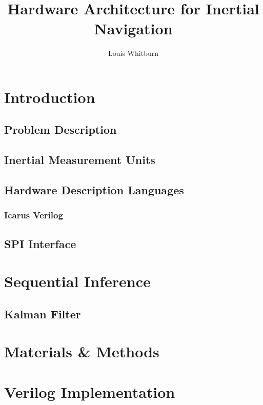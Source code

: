 \documentclass{report}
\author{Louis Whitburn}
\title{Hardware Architecture for Inertial Navigation}
\begin{document}
 
    \maketitle

    \tableofcontents
    
    \chapter{Introduction}
    
        \section{Problem Description}
        \section{Inertial Measurement Units}
        \section{Hardware Description Languages}
    
            \subsection{Icarus Verilog}
    
        \section {SPI Interface}
        
    \chapter{Sequential Inference}
    
        \section{Kalman Filter}
    
    \chapter{Materials \& Methods}
    
    \chapter{Verilog Implementation}
    
\end{document}
